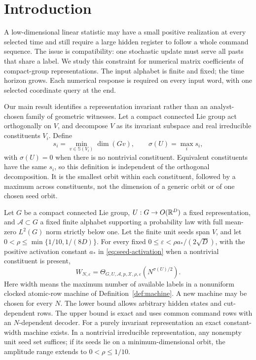 \section{Introduction}
A low-dimensional linear statistic may have a small positive realization
at every selected time and still require a large hidden register to
follow a whole command sequence. The issue is compatibility: one
stochastic update must serve all pasts that share a label. We study
this constraint for numerical matrix coefficients of compact-group
representations. The input alphabet is finite and fixed; the time
horizon grows. Each numerical response is required on every input
word, with one selected coordinate query at the end.

Our main result identifies a representation invariant rather than an
analyst-chosen family of geometric witnesses. Let a compact connected
Lie group act orthogonally on $V$, and decompose $V$ as its invariant
subspace and real irreducible constituents $V_i$. Define
\[
 s_i=\min_{v\in\mathbb S(V_i)}\dim(Gv),\qquad
 \sigma(U)=\max_i s_i,
\]
with $\sigma(U)=0$ when there is no nontrivial constituent. Equivalent
constituents have the same $s_i$, so this definition is independent of
the orthogonal decomposition. It is the smallest orbit within each
constituent, followed by a maximum across constituents, not the
dimension of a generic orbit or of one chosen seed orbit.

\begin{theorem}\label{thm:main}
Let $G$ be a compact connected Lie group, $U:G\to O(\mathbb R^D)$ a fixed
representation, and $\mathcal A\subset G$ a fixed finite alphabet
supporting a probability law with full mean-zero $L^2(G)$ norm
strictly below one. Let the finite unit seeds span $V$, and let
$0<\rho\le\min\{1/10,1/(8D)\}$. For every fixed
$0\le\varepsilon<\rho a_*/(2\sqrt D)$, with the positive activation
constant $a_*$ in \eqref{eq:seed-activation} when a nontrivial
constituent is present,
\begin{equation}\label{eq:headline39}
 W_{N,\varepsilon}=\Theta_{G,U,\mathcal A,p,\mathcal X,\rho,\varepsilon}
                              (N^{\sigma(U)/2}).
\end{equation}
Here width means the maximum number of available labels in a
nonuniform clocked atomic-row machine of Definition~\ref{def:machine}.
A new machine may be chosen for every $N$. The lower bound allows
arbitrary hidden states and cut-dependent rows. The upper bound is
exact and uses common command rows with an $N$-dependent decoder.
For a purely invariant representation an exact constant-width machine
exists. In a nontrivial irreducible representation, any nonempty
unit seed set suffices; if its seeds lie on a minimum-dimensional
orbit, the amplitude range extends to $0<\rho\le1/10$.
\end{theorem}

